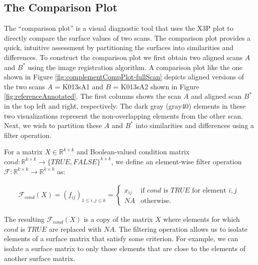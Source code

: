 \documentclass[11pt,]{isuthesis}
\begin{document}
\hypertarget{the-comparison-plot}{%
\subsection{The Comparison Plot}\label{the-comparison-plot}}

The ``comparison plot'' is a visual diagnostic tool that uses the X3P plot to directly compare the surface values of two scans.
The comparison plot provides a quick, intuitive assessment by partitioning the surfaces into similarities and differences.
To construct the comparison plot we first obtain two aligned scans \(A\) and \(B^*\) using the image registration algorithm.
A comparison plot like the one shown in Figure \ref{fig:complementCompPlot-fullScan} depicts aligned versions of the two scans \(A\) = K013sA1 and \(B\) = K013sA2 shown in Figure \ref{fig:referenceAnnotated}.
The first columns shows the scan \(A\) and aligned scan \(B^*\) in the top left and right, respectively.
The dark gray (gray40) elements in these two visualizations represent the non-overlapping elements from the other scan.
Next, we wish to partition these \(A\) and \(B^*\) into similarities and differences using a filter operation.

For a matrix \(X \in \mathbb{R}^{k \times k}\) and Boolean-valued condition matrix \(cond: \mathbb{R}^{k \times k} \to \{TRUE,FALSE\}^{k \times k}\), we define an element-wise filter operation \(\mathcal{F}: \mathbb{R}^{k \times k} \to \mathbb{R}^{k \times k}\) as:

\begin{align*}
\mathcal{F}_{cond}(X) =
(f_{ij})_{1 \leq i,j \leq k} =
\begin{cases}
x_{ij} &\text{if $cond$ is $TRUE$ for element $i,j$} \\
NA &\text{otherwise.}
\end{cases}
\end{align*}

The resulting \(\mathcal{F}_{cond}(X)\) is a copy of the matrix \(X\) where elements for which \(cond\) is \(TRUE\) are replaced with \(NA\).
The filtering operation allows us to isolate elements of a surface matrix that satisfy some criterion.
For example, we can isolate a surface matrix to only those elements that are close to the elements of another surface matrix.
\end{document}
